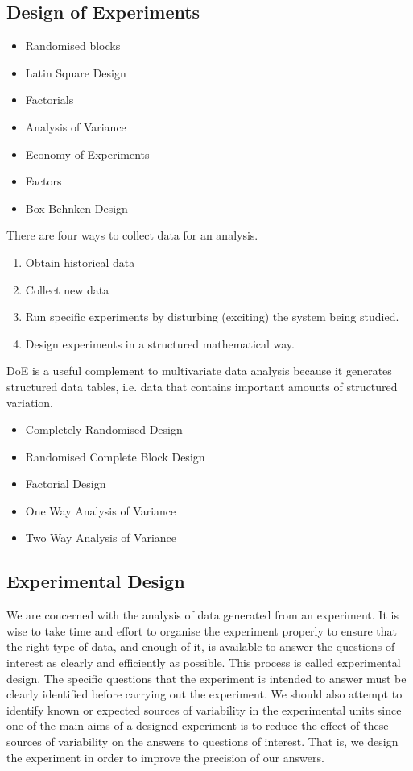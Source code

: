 \subsection*{Design of Experiments}
\begin{itemize}
\item 	Randomised blocks
\item 	Latin Square Design
\item 	Factorials
\item 	Analysis of Variance
\item 	Economy of Experiments
\item 	Factors
\item 	Box Behnken Design
\end{itemize}
There are four ways to collect data for an analysis.
\begin{enumerate}
\item	Obtain historical data
\item	Collect new data
\item	Run specific experiments by disturbing (exciting) the system being studied.
\item	Design experiments in a structured mathematical way.
\end{enumerate}
DoE is a useful complement to multivariate data analysis because it generates  structured data tables, i.e. data that contains important amounts of structured variation.

\begin{itemize}
\item 	Completely Randomised Design
\item 	Randomised Complete Block Design
\item 	Factorial Design
\item 	One Way Analysis of Variance
\item 	Two Way Analysis of Variance
\end{itemize}
\subsection{Experimental Design}
We are concerned with the analysis of data generated from an experiment. It is wise to take time and effort to organise the experiment properly to ensure that the right type of data, and enough of it, is available to answer the questions of interest as clearly and efficiently as possible. This process is called experimental design.
The specific questions that the experiment is intended to answer must be clearly identified before carrying out the experiment. We should also attempt to identify known or expected sources of variability in the experimental units since one of the main aims of a designed experiment is to reduce the effect of these sources of variability on the answers to questions of interest. That is, we design the experiment in order to improve the precision of our answers.
